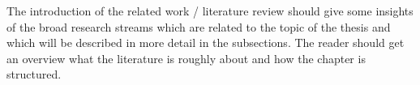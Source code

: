 The introduction of the related work / literature review should give some insights of the broad research streams which are related to the topic of the thesis and which will be described in more detail in the subsections. The reader should get an overview what the literature is roughly about and how the chapter is structured.


